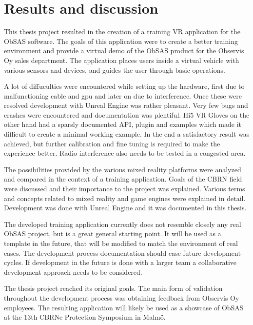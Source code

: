 \documentclass[12pt, a4paper,oneside, nocenter]{thesis}
\begin{document}
\chapter{\texorpdfstring{Results and discussion}{results-discussion}}
This thesis project resulted in the creation of a training VR application for the ObSAS software. The goals of this application were to create a better training environment and provide a virtual demo of the ObSAS product for the Observis Oy sales department. The application places users inside a virtual vehicle with various sensors and devices, and guides the user through basic operations.
\par
A lot of diffuculties were encountered while setting up the hardware, first due to malfunctioning cable and gpu and later on due to interference. Once these were resolved development with Unreal Engine was rather pleasant. Very few bugs and crashes were encountered and documentation was plentiful. Hi5 VR Gloves on the other hand had a sparsly documented API, plugin and examples which made it difficult to create a minimal working example. In the end a satisfactory result was achieved, but further calibration and fine tuning is required to make the experience better. Radio interference also needs to be tested in a congested area.
\par
The possibilities provided by the various mixed reality platforms were analyzed and compared in the context of a training application. Goals of the CBRN field were discussed and their importance to the project was explained. Various terms and concepts related to mixed reality and game engines were explained in detail. Development was done with Unreal Engine and it was documented in this thesis.
\par
The developed training application currently does not resemble closely any real ObSAS project, but is a great general starting point. It will be used as a template in the future, that will be modified to match the environment of real cases. The development process documentation should ease future development cycles. If development in the future is done with a larger team a collaborative development approach needs to be considered.
\par
The thesis project reached its original goals. The main form of validation throughout the development process was obtaining feedback from Observis Oy employees. The resulting application will likely be used as a showcase of ObSAS at the 13th CBRNe Protection Symposium in Malmö.
\newpage

\nocite{*}

\end{document}
